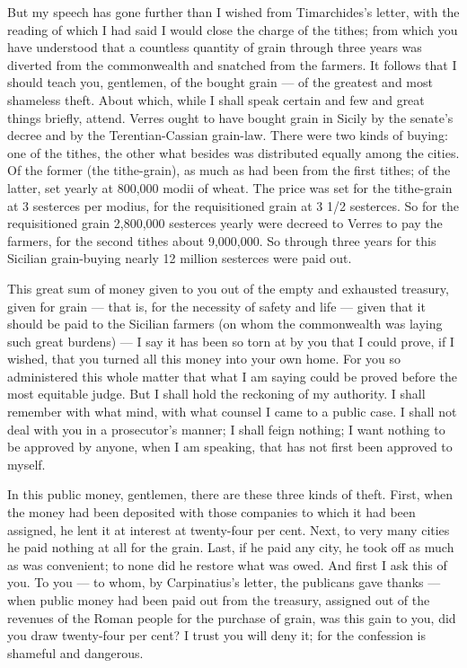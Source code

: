  But my speech has gone further than I wished from Timarchides's letter, with the reading of which I had said I would close the charge of the tithes; from which you have understood that a countless quantity of grain through three years was diverted from the commonwealth and snatched from the farmers. It follows that I should teach you, gentlemen, of the bought grain --- of the greatest and most shameless theft. About which, while I shall speak certain and few and great things briefly, attend. Verres ought to have bought grain in Sicily by the senate's decree and by the Terentian-Cassian grain-law. There were two kinds of buying: one of the tithes, the other what besides was distributed equally among the cities. Of the former (the tithe-grain), as much as had been from the first tithes; of the latter, set yearly at 800,000 modii of wheat. The price was set for the tithe-grain at 3 sesterces per modius, for the requisitioned grain at 3 1/2 sesterces. So for the requisitioned grain 2,800,000 sesterces yearly were decreed to Verres to pay the farmers, for the second tithes about 9,000,000. So through three years for this Sicilian grain-buying nearly 12 million sesterces were paid out.

 This great sum of money given to you out of the empty and exhausted treasury, given for grain --- that is, for the necessity of safety and life --- given that it should be paid to the Sicilian farmers (on whom the commonwealth was laying such great burdens) --- I say it has been so torn at by you that I could prove, if I wished, that you turned all this money into your own home. For you so administered this whole matter that what I am saying could be proved before the most equitable judge. But I shall hold the reckoning of my authority. I shall remember with what mind, with what counsel I came to a public case. I shall not deal with you in a prosecutor's manner; I shall feign nothing; I want nothing to be approved by anyone, when I am speaking, that has not first been approved to myself.

 In this public money, gentlemen, there are these three kinds of theft. First, when the money had been deposited with those companies to which it had been assigned, he lent it at interest at twenty-four per cent. Next, to very many cities he paid nothing at all for the grain. Last, if he paid any city, he took off as much as was convenient; to none did he restore what was owed. And first I ask this of you. To you --- to whom, by Carpinatius's letter, the publicans gave thanks --- when public money had been paid out from the treasury, assigned out of the revenues of the Roman people for the purchase of grain, was this gain to you, did you draw twenty-four per cent? I trust you will deny it; for the confession is shameful and dangerous.

